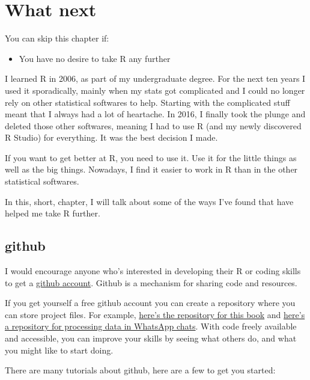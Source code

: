 \documentclass[
]{book}
\providecommand{\tightlist}{%
  \setlength{\itemsep}{0pt}\setlength{\parskip}{0pt}}
\begin{document}
\hypertarget{whatnext}{%
\chapter{What next}\label{whatnext}}

\begin{los}
You can skip this chapter if:

\begin{itemize}
\tightlist
\item
  You have no desire to take R any further
\end{itemize}
\end{los}

I learned R in 2006, as part of my undergraduate degree. For the next ten years I used it sporadically, mainly when my stats got complicated and I could no longer rely on other statistical softwares to help. Starting with the complicated stuff meant that I always had a lot of heartache. In 2016, I finally took the plunge and deleted those other softwares, meaning I had to use R (and my newly discovered R Studio) for everything. It was the best decision I made.

If you want to get better at R, you need to use it. Use it for the little things as well as the big things. Nowadays, I find it easier to work in R than in the other statistical softwares.

In this, short, chapter, I will talk about some of the ways I've found that have helped me take R further.

\hypertarget{github}{%
\section{github}\label{github}}

I would encourage anyone who's interested in developing their R or coding skills to get a \href{https://github.com/}{github account}. Github is a mechanism for sharing code and resources.

If you get yourself a free github account you can create a repository where you can store project files. For example, \href{https://github.com/jillymackay/RatRDSVS}{here's the repository for this book} and \href{https://github.com/jillymackay/whatsappvisualiser}{here's a repository for processing data in WhatsApp chats}. With code freely available and accessible, you can improve your skills by seeing what others do, and what you might like to start doing.

There are many tutorials about github, here are a few to get you started:
\end{document}
